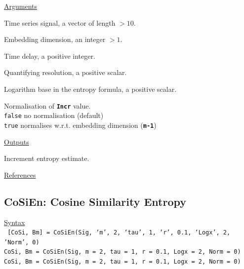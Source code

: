 \documentclass[12pt, a4paper, titlepage, openany]{book}
\begin{document}
\noindent \ul{Arguments}
\begin{description}[labelsep=1cm, labelwidth=2cm, nosep, style=multiline,leftmargin=3cm]\footnotesize
\item[\texttt{Sig}]		Time series signal, a vector of length $> 10$.
\item[\texttt{m}]		Embedding dimension, an integer $> 1$.
\item[\texttt{tau}]		Time delay, a positive integer.
\item[\texttt{R}]		Quantifying resolution, a positive scalar.
\item[\texttt{Logx}]	Logarithm base in the entropy formula, a positive scalar.
\item[\texttt{Norm}]	Normalisation of \texttt{\textbf{Incr}} value.\\
						\texttt{false} \hspace{10pt} no normalisation (default)\\
						\texttt{true} \hspace{15pt} normalises w.r.t. embedding dimension (\texttt{\textbf{m-1}})
\end{description}

\noindent \ul{Outputs}
\begin{description}[labelsep=1cm, labelwidth=2cm, nosep, style=multiline,leftmargin=3cm]\footnotesize
\item[\texttt{Incr}]	Increment entropy  estimate.
\end{description}

\noindent \ul{References}\hspace{1cm}
\cite{Incr1} \cite{Incr2} \cite{Incr3}



\newpage
\subsection{\normalsize CoSiEn: \hspace{15mm} Cosine Similarity Entropy}\label{CoSiEn}
\noindent\ul{Syntax} \vspace{6mm} \\ \noindent \texttt{\footnotesize
[CoSi, Bm] = CoSiEn(Sig, ‘m’, 2, ‘tau’, 1, ‘r’, 0.1, ‘Logx’, 2, 'Norm', 0) \\
CoSi, Bm  = CoSiEn(Sig, m = 2, tau = 1, r = 0.1, Logx = 2, Norm = 0) \\
CoSi, Bm  = CoSiEn(Sig, m = 2, tau = 1, r = 0.1, Logx = 2, Norm = 0)}
\end{document}
